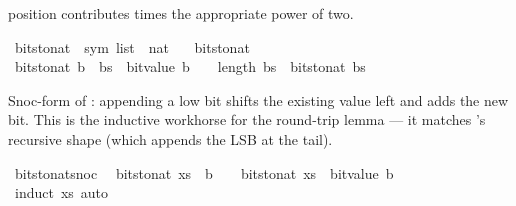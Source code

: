 \begin{isabellebody}
\begin{isamarkuptext}
  position contributes  times the appropriate
  power of two.%
\end{isamarkuptext}\isamarkuptrue%
\isamarkupfalse%
\ bits{\isacharunderscore}{\kern0pt}to{\isacharunderscore}{\kern0pt}nat\ {\isacharcolon}{\kern0pt}{\isacharcolon}{\kern0pt}\ {\isachardoublequoteopen}sym{}\ list\ {\isasymRightarrow}\ nat{\isachardoublequoteclose}\ \isanewline
\ \ {\isachardoublequoteopen}bits{\isacharunderscore}{\kern0pt}to{\isacharunderscore}{\kern0pt}nat\ {\isacharbrackleft}{\kern0pt}{\isacharbrackright}{\kern0pt}\ {\isacharequal}{\kern0pt}\ {}{\isachardoublequoteclose}\isanewline
{\isacharbar}{\kern0pt}\ {\isachardoublequoteopen}bits{\isacharunderscore}{\kern0pt}to{\isacharunderscore}{\kern0pt}nat\ {\isacharparenleft}{\kern0pt}b\ {\isacharhash}{\kern0pt}\ bs{\isacharparenright}{\kern0pt}\ {\isacharequal}{\kern0pt}\ bit{\isacharunderscore}{\kern0pt}value\ b\ {\isacharasterisk}{\kern0pt}\ {}\ {\isacharcircum}{\kern0pt}\ length\ bs\ {\isacharplus}{\kern0pt}\ bits{\isacharunderscore}{\kern0pt}to{\isacharunderscore}{\kern0pt}nat\ bs{\isachardoublequoteclose}%
\begin{isamarkuptext}%
Snoc-form of : appending a low bit
  shifts the existing value left and adds the new bit.  This
  is the inductive workhorse for the round-trip lemma — it
  matches 's recursive shape (which appends
  the LSB at the tail).%
\end{isamarkuptext}\isamarkuptrue%
\isamarkupfalse%
\ bits{\isacharunderscore}{\kern0pt}to{\isacharunderscore}{\kern0pt}nat{\isacharunderscore}{\kern0pt}snoc{\isacharcolon}{\kern0pt}\isanewline
\ \ {\isachardoublequoteopen}bits{\isacharunderscore}{\kern0pt}to{\isacharunderscore}{\kern0pt}nat\ {\isacharparenleft}{\kern0pt}xs\ {\isacharat}{\kern0pt}\ {\isacharbrackleft}{\kern0pt}b{\isacharbrackright}{\kern0pt}{\isacharparenright}{\kern0pt}\ {\isacharequal}{\kern0pt}\ {}\ {\isacharasterisk}{\kern0pt}\ bits{\isacharunderscore}{\kern0pt}to{\isacharunderscore}{\kern0pt}nat\ xs\ {\isacharplus}{\kern0pt}\ bit{\isacharunderscore}{\kern0pt}value\ b{\isachardoublequoteclose}\isanewline
%
\isadelimproof
\ \ %
\endisadelimproof
%
\isatagproof
{}\isamarkupfalse%
\ {\isacharparenleft}{\kern0pt}induct\ xs{\isacharparenright}{\kern0pt}\ auto%
\endisatagproof
{\isafoldproof}%

\end{isabellebody}
